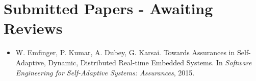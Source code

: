\section{Submitted Papers - Awaiting Reviews}
\begin{itemize}
	\item W. Emfinger, P. Kumar, A. Dubey, G. Karsai. Towards Assurances in Self-Adaptive, Dynamic, Distributed Real-time Embedded Systems. In \textit{Software Engineering for Self-Adaptive Systems: Assurances}, 2015.
\end{itemize}
